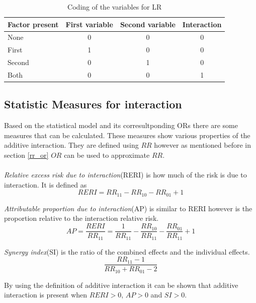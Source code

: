 \documentclass[10pt,a4paper]{report}
\begin{document}
\begin{table}[h]
\begin{tabular}{| l | c c c|}
  \hline
  Factor present & First variable & Second variable & Interaction \\
  \hline
  None & 0 & 0 & 0 \\
  \hline 
  First & 1 & 0 & 0 \\
  \hline
  Second & 0 & 1 & 0 \\
  \hline
  Both & 0 & 0 & 1 \\
  \hline
\end{tabular}
\caption{Coding of the variables for LR}
\label{table:coding}
\end{table}

\subsection{Statistic Measures for interaction}
Based on the statistical model and its corresultponding ORs there are some measures that can be calculated. These measures show various properties of the additive interaction. They are defined using $RR$ however as mentioned before in section \ref{rr_or} $OR$ can be used to approximate $RR$.\\
\\
\emph{Relative  excess risk due to interaction}(RERI) is how much of the risk is due to interaction\cite{rothman2008modern, recoding_2011}. It is defined as\cite{rothman2008modern, recoding_2011}
\begin{equation}
RERI=RR_{11}-RR_{10}-RR_{01}+1
\end{equation}

\emph{Attributable proportion due to interaction}(AP) is similar to RERI however is the proportion relative to the interaction relative risk\cite{rothman2008modern, recoding_2011}.
\begin{equation}
AP=\frac{RERI}{RR_{11}}=\frac{1}{RR_{11}}-\frac{RR_{10}}{RR_{11}}-\frac{RR_{01}}{RR_{11}}+1
\end{equation}

\emph{Synergy index}(SI) is the ratio of the combined effects and the individual effects\cite{rothman2008modern, recoding_2011}.
\begin{equation}
\frac{RR_{11}-1}{RR_{10}+RR_{01}-2}
\end{equation}

By using the definition of additive interaction it can be shown that additive interaction is present when $RERI>0$, $AP>0$ and $SI>0$\cite{recoding_2011}.
\end{document}

